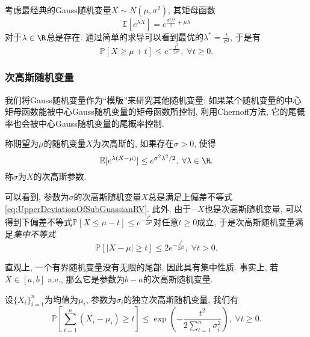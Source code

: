 \begin{example}[Gauss随机变量的上偏差不等式]
	考虑最经典的Gauss随机变量$X \sim N(\mu, \sigma^2)$, 其矩母函数
	\begin{equation}
		\mathbb{E}[e^{\lambda X}] = e^{\frac{\sigma^2 \lambda^2}{2} + \mu \lambda} 		
	\end{equation}
	对于$\lambda \in \R$总是存在. 
	通过简单的求导可以看到最优的$\lambda^* = \frac{t}{\sigma^2}$, 于是有
	\begin{equation}\label{eq:UpperDeviationOfSubGuassianRV}
		\mathbb{P}[X \geq \mu + t] \leq e^{- \frac{t^2}{2 \sigma^2}},\; \forall t \geq 0. 
	\end{equation}
\end{example}

\subsubsection{次高斯随机变量}

我们将Gauss随机变量作为“模版”来研究其他随机变量: 如果某个随机变量的中心矩母函数能被中心Gauss随机变量的矩母函数所控制, 利用Chernoff方法, 它的尾概率也会被中心Gauss随机变量的尾概率控制. 

\begin{definition}[次高斯随机变量]
	称期望为$\mu$的随机变量$X$为次高斯的, 如果存在$\sigma > 0$, 使得
	\begin{equation*}
		\mathbb{E}[e^{\lambda(X - \mu)}] \leq e^{\sigma^2 \lambda^2 /2},\; \forall \lambda \in \R. 
	\end{equation*}
	称$\sigma$为$X$的次高斯参数. 
\end{definition}
可以看到, 参数为$\sigma$的次高斯随机变量$X$总是满足上偏差不等式 \eqref{eq:UpperDeviationOfSubGuassianRV}.  
此外, 由于$-X$也是次高斯随机变量, 可以得到下偏差不等式$\mathbb{P}[X \leq \mu - t] \leq e^{- \frac{t^2}{2 \sigma^2}}$对任意$t \geq 0$成立, 于是次高斯随机变量满足\emph{集中不等式}
\begin{equation}\label{eq:SubGuassianConcentration}
	\mathbb{P}[|X - \mu| \geq t] \leq 2 e^{- \frac{t^2}{2 \sigma^2}},\; \forall t > 0. 
\end{equation}

直观上, 一个有界随机变量没有无限的尾部, 因此具有集中性质. 
事实上, 若$X \in [a,b]$ a.e., 那么它是参数为$b-a$的次高斯随机变量. 

\begin{proposition}[Hoeffding界]
	设$\{X_i\}_{i=1}^n$为均值为$\mu_i$, 参数为$\sigma_i$的独立次高斯随机变量, 我们有
	\begin{equation}
		\mathbb{P} \left[ \sum_{i=1}^n (X_i - \mu_i) \geq t \right]
		\leq \exp \left( - \frac{t^2}{2 \sum_{i=1}^n \sigma_i^2} \right ),\; 
		\forall t \geq 0.
	\end{equation}
\end{proposition}

